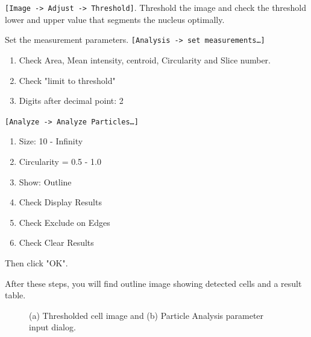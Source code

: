 \documentclass[11pt,a4paper,oneside]{report}
\newcommand{\ijmenu}[1]{\texttt{\small#1}}
\begin{document}
\begin{enumerate}
\small{
\item \ijmenu{[Image -> Adjust -> Threshold]}. 
Threshold the image and check the threshold lower and upper value that segments the nucleus optimally. 
\item Set the measurement parameters. \ijmenu{[Analysis -> set measurements\ldots]}
\begin{enumerate}
\item Check Area, Mean intensity, centroid, Circularity and Slice number. 
\item Check "limit to threshold"
\item Digits after decimal point: 2
\end{enumerate}
\item \ijmenu{[Analyze -> Analyze Particles\ldots]}
\begin{enumerate}
\item Size: 10 - Infinity
\item Circularity = 0.5 - 1.0
\item Show: Outline
\item Check Display Results
\item Check Exclude on Edges
\item Check Clear Results
\end{enumerate}
\item Then click "OK". 
}
\end{enumerate}
After these steps, you will find outline image showing detected cells and a result table. 

\begin{figure}[htbp]
 \centering
 \caption{ (a) Thresholded cell image and (b) Particle Analysis parameter input dialog.}
 \label{fig:ParticleAnalysis}
\end{figure}
\end{document}

